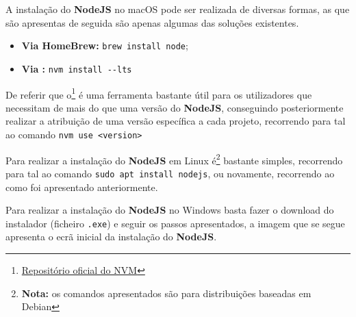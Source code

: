 \label{nodeAttachments}



A instalação do \textbf{NodeJS} no macOS pode ser realizada de diversas formas, as que são apresentas de seguida são apenas algumas das soluções existentes.
\begin{itemize}
	\item \textbf{Via HomeBrew:} \verb|brew install node|;
	\item \textbf{Via :} \verb|nvm install --lts|
\end{itemize}

De referir que o\textbf{}\footnote{\href{https://github.com/nvm-sh/nvm}{Repositório oficial do NVM}} é uma ferramenta bastante útil para os utilizadores que necessitam de mais do que uma versão do \textbf{NodeJS}, conseguindo posteriormente realizar a atribuição de uma versão específica a cada projeto, recorrendo para tal ao comando \verb|nvm use <version>|


Para realizar a instalação do \textbf{NodeJS} em Linux é\footnote{\textbf{Nota:} os comandos apresentados são para distribuições baseadas em Debian} bastante simples, recorrendo para tal ao comando \verb|sudo apt install nodejs|, ou novamente, recorrendo ao \textbf{} como foi apresentado anteriormente.


Para realizar a instalação do \textbf{NodeJS} no Windows basta fazer o download do instalador (ficheiro \verb|.exe|) e seguir os passos apresentados, a imagem que se segue apresenta o ecrã inicial da instalação do \textbf{NodeJS}.


\label{nodeArch}

